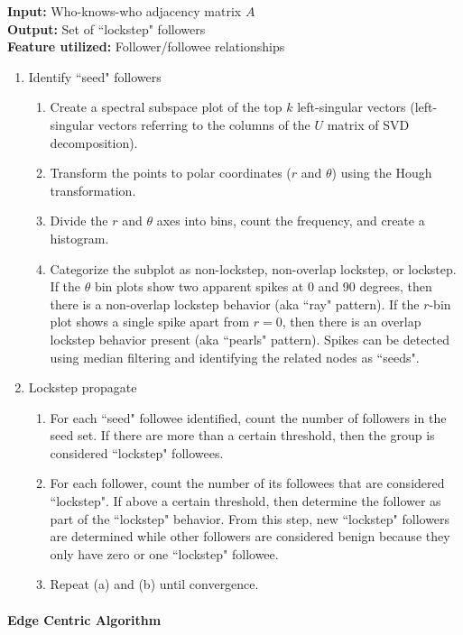 \documentclass[11pt, oneside]{article}   	%
\begin{document}
\textbf{Input:} Who-knows-who adjacency matrix $A$\\
\textbf{Output:} Set of ``lockstep" followers\\
\textbf{Feature utilized:} Follower/followee relationships

\begin{enumerate}
	\item Identify ``seed" followers
	\begin{enumerate}
		\item Create a spectral subspace plot of the top $k$ left-singular vectors (left-singular vectors referring to the columns of the $U$ matrix of SVD decomposition).
		\item Transform the points to polar coordinates ($r$ and $\theta$) using the Hough transformation.
		\item Divide the $r$ and $\theta$ axes into bins, count the frequency, and create a histogram.
		\item Categorize the subplot as non-lockstep, non-overlap lockstep, or lockstep.
		If the $\theta$ bin plots show two apparent spikes at 0 and 90 degrees, then there is a non-overlap lockstep behavior (aka ``ray" pattern).
		If the $r$-bin plot shows a single spike apart from $r = 0$, then there is an overlap lockstep behavior present (aka ``pearls" pattern).
		Spikes can be detected using median filtering and identifying the related nodes as ``seeds".
	\end{enumerate}
	\item Lockstep propagate
	\begin{enumerate}
		\item For each ``seed" followee identified, count the number of followers in the seed set.
		If there are more than a certain threshold, then the group is considered ``lockstep" followees.
		\item For each follower, count the number of its followees that are considered ``lockstep".
		If above a certain threshold, then determine the follower as part of the ``lockstep" behavior.
		From this step, new ``lockstep" followers are determined while other followers are considered benign because they only have zero or one ``lockstep" followee.
		\item Repeat (a) and (b) until convergence.
	\end{enumerate}
\end{enumerate}

\paragraph{Edge Centric Algorithm}
\quad
\end{document}
